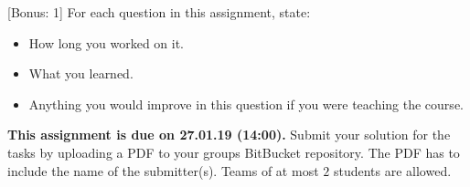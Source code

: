 \documentclass{exam}
\newcommand{\duedate}{27.01.19 (14:00)}
\newcommand{\due}{{\bf This assignment is due on \duedate.} }
\begin{document}
\begin{questions}
		
	[Bonus: 1]
	For each question in this assignment, state:
	\begin{itemize}
		\item How long you worked on it.
		\item What you learned.
		\item Anything you would improve in this question if you were teaching the course.
	\end{itemize}
	\end{questions}

\noindent
\due Submit your solution for the tasks by uploading a PDF to your groups BitBucket repository. The PDF has to include the name of the submitter(s). Teams of at most $2$ students are allowed.
\end{document}
